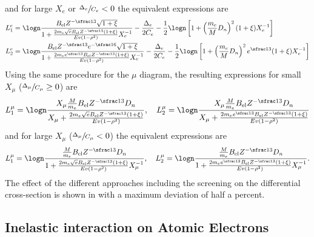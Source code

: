 and for large $X_e$ or $\sfrac{\Delta_e}{C_e} < 0$ the equivalent expressions are
\begin{subequations}
\begin{align}
    L_1^e &= \logn \frac{B_{\text{el}}Z^{-\sfrac13}\sqrt{1 + \xi}}{1 + \frac{2m_e\sqrt{e}B_{\text{el}}Z^{-\sfrac13}(1 + \xi)}{Ev(1 - \rho^2)}X_e^{-1}}
        - \frac{\Delta_e}{2C_e}
        - \frac{1}{2}\logn \left[ 1 + \left(\frac{m_e}{M}D_n\right)^2 (1 + \xi) X_e^{-1} \right]
    \\
    L_2^e &= \logn \frac{B_{\text{el}}Z^{-\sfrac13} e^{-\sfrac16} \sqrt{1 + \xi}}{1 + \frac{2m_e e^{\sfrac13} B_{\text{el}}Z^{-\sfrac13}(1 + \xi)}{Ev(1 - \rho^2)}X_e^{-1}}
        - \frac{\Delta_e}{2C_e}
        - \frac{1}{2} \logn \left[ 1 + \left(\frac{m_e}{M}D_n\right)^2 e^{\sfrac13} (1 + \xi) X_e^{-1} \right]
\end{align}
\end{subequations}
Using the same procedure for the $\mu$ diagram, the resulting expressions for small $X_\mu$ ($\sfrac{\Delta_\mu}{C_\mu} \geq 0$) are
\begin{align}
    L_1^{\mu} = \logn \frac{X_\mu \frac{M}{m_e} B_{\text{el}} Z^{-\sfrac13} D_n}{X_\mu + \frac{2 m_e \sqrt{e} B_{\text{el}} Z^{-\sfrac13}(1 + \xi)}{Ev(1 - \rho^2)}} ,
    \quad
    L_2^{\mu} = \logn \frac{X_\mu \frac{M}{m_e} B_{\text{el}} Z^{-\sfrac13} D_n}{X_\mu + \frac{2 m_e e^{\sfrac13} B_{\text{el}} Z^{-\sfrac13} (1 + \xi)}{Ev(1 - \rho^2)}}
\end{align}
and for large $X_\mu$ ($\sfrac{\Delta_\mu}{C_\mu} < 0$) the equivalent expressions are
\begin{align}
    L_1^{\mu} = \logn \frac{\frac{M}{m_e} B_{\text{el}} Z^{-\sfrac13} D_n}{1 + \frac{2 m_e \sqrt{e} B_{\text{el}} Z^{-\sfrac13}(1 + \xi)}{Ev(1 - \rho^2)} X_\mu^{-1}} ,
    \quad
    L_2^{\mu} = \logn \frac{\frac{M}{m_e} B_{\text{el}} Z^{-\sfrac13} D_n}{1 + \frac{2 m_e e^{\sfrac13} B_{\text{el}} Z^{-\sfrac13} (1 + \xi)}{Ev(1 - \rho^2)} X_\mu^{-1}} .
\end{align}
The effect of the different approaches including the screening on the differential cross-section is shown in  with a maximum deviation of half a percent.

\subsection{Inelastic interaction on Atomic Electrons}

